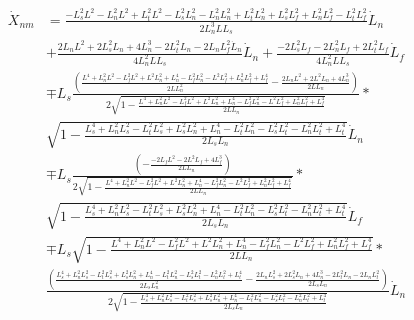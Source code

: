 \documentclass[11pt, landscape]{article}
\begin{document}
\begin{align}
  \dot{X}_{nm} &= \frac{-L_s^2L^2 - L_n^2L^2 + L_t^2L^2 - L_s^2L_{n}^2 - L_n^2L_{n}^2 + L_t^2L_{n}^2 + L_s^2L_{f}^2 + L_n^2L_{f}^2 - L_t^2L_{f}^2}{{2L_n^{3}LL_s}}\dot{L}_n\\
  &+ \frac{2L_nL^2 + 2L_s^2L_{n} + 4L_n^3 - 2L_t^2L_{n} - 2L_nL_{f}^2\dot{L}_n}{4L_n^2LL_s}\dot{L}_n + \frac{-2L_s^2L_{f} - 2L_n^2L_{f} + 2L_t^2L_{f}}{4L_n^2LL_s}\dot{L}_f\\
  &\mp L_s\frac{\left(\frac{L^4 + L_n^2L^2 - L_f^2L^2 + L^2L_{n}^2 + L_{n}^4 - L_f^2L_{n}^2 - L^2L_{f}^2 + L_n^2L_{f}^2 + L_{f}^4}{2LL^2_{n}} - \frac{2L_nL^2 + 2L^2L_{n} + 4L_{n}^3}{2LL_{n}}\right)}{2\sqrt{1-\frac{L^4 + L_n^2L^2 - L_f^2L^2 + L^2L_{n}^2 + L_{n}^4 - L_f^2L_{n}^2 - L^2L_{f}^2 + L_n^2L_{f}^2 + L_{f}^4}{2LL_{n}}}}*\\
  &\sqrt{1-\frac{L_{s}^4 + L_n^2L_{s}^2 - L_t^2L_{s}^2 + L_s^2L_{n}^2 + L_{n}^4 - L_t^2L_{n}^2 - L_s^2L_{t}^2 - L_n^2L_{t}^2 + L_{t}^4}{2L_{s}L_{n}}}\dot{L}_n\\
  &\mp L_s\frac{\left(-\frac{-2L_fL^2 - 2L^2L_{f} + 4L_{f}^3}{2LL_{n}}\right)}{2\sqrt{1-\frac{L^4 + L_n^2L^2 - L_f^2L^2 + L^2L_{n}^2 + L_{n}^4 - L_f^2L_{n}^2 - L^2L_{f}^2 + L_n^2L_{f}^2 + L_{f}^4}{2LL_{n}}}}*\\
  &\sqrt{1-\frac{L_{s}^4 + L_n^2L_{s}^2 - L_t^2L_{s}^2 + L_s^2L_{n}^2 + L_{n}^4 - L_t^2L_{n}^2 - L_s^2L_{t}^2 - L_n^2L_{t}^2 + L_{t}^4}{2L_{s}L_{n}}}\dot{L}_f\\
  &\mp L_s\sqrt{1-\frac{L^4 + L_n^2L^2 - L_f^2L^2 + L^2L_{n}^2 + L_{n}^4 - L_f^2L_{n}^2 - L^2L_{f}^2 + L_n^2L_{f}^2 + L_{f}^4}{2LL_{n}}}*\\
  &\frac{\left(\frac{L_{s}^4 + L_n^2L_{s}^2 - L_t^2L_{s}^2 + L_s^2L_{n}^2 + L_{n}^4 - L_t^2L_{n}^2 - L_s^2L_{t}^2 - L_n^2L_{t}^2 + L_{t}^4}{2L_{s}L^2_{n}}
    - \frac{2L_nL_{s}^2 + 2L_s^2L_{n} + 4L_{n}^3 - 2L_t^2L_{n} - 2L_nL_{t}^2}{2L_{s}L_{n}}\right)}{2\sqrt{1-\frac{L_{s}^4 + L_n^2L_{s}^2 - L_t^2L_{s}^2 + L_s^2L_{n}^2 + L_{n}^4 - L_t^2L_{n}^2 - L_s^2L_{t}^2 - L_n^2L_{t}^2 + L_{t}^4}{2L_{s}L_{n}}}}\dot{L}_n\\
\end{align}
\end{document}
